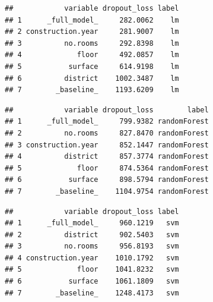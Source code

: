 \documentclass[12pt,]{krantz}
\newenvironment{Shaded}{\begin{snugshade}}{\end{snugshade}}
\newcommand{\DataTypeTok}[1]{\textcolor[rgb]{0.13,0.29,0.53}{#1}}
\newcommand{\DecValTok}[1]{\textcolor[rgb]{0.00,0.00,0.81}{#1}}
\newcommand{\KeywordTok}[1]{\textcolor[rgb]{0.13,0.29,0.53}{\textbf{#1}}}
\newcommand{\NormalTok}[1]{#1}
\newcommand{\OperatorTok}[1]{\textcolor[rgb]{0.81,0.36,0.00}{\textbf{#1}}}
\newcommand{\StringTok}[1]{\textcolor[rgb]{0.31,0.60,0.02}{#1}}
\theoremstyle{definition}
\theoremstyle{definition}
\theoremstyle{definition}
\theoremstyle{remark}
\begin{document}
\begin{verbatim}
##            variable dropout_loss label
## 1      _full_model_     282.0062    lm
## 2 construction.year     281.9007    lm
## 3          no.rooms     292.8398    lm
## 4             floor     492.0857    lm
## 5           surface     614.9198    lm
## 6          district    1002.3487    lm
## 7        _baseline_    1193.6209    lm
\end{verbatim}

\begin{Shaded}
\end{Shaded}

\begin{verbatim}
##            variable dropout_loss        label
## 1      _full_model_     799.9382 randomForest
## 2          no.rooms     827.8470 randomForest
## 3 construction.year     852.1447 randomForest
## 4          district     857.3774 randomForest
## 5             floor     874.5364 randomForest
## 6           surface     898.5794 randomForest
## 7        _baseline_    1104.9754 randomForest
\end{verbatim}

\begin{Shaded}
\end{Shaded}

\begin{verbatim}
##            variable dropout_loss label
## 1      _full_model_     960.1219   svm
## 2          district     902.5403   svm
## 3          no.rooms     956.8193   svm
## 4 construction.year    1010.1792   svm
## 5             floor    1041.8232   svm
## 6           surface    1061.1809   svm
## 7        _baseline_    1248.4173   svm
\end{verbatim}
\end{document}
